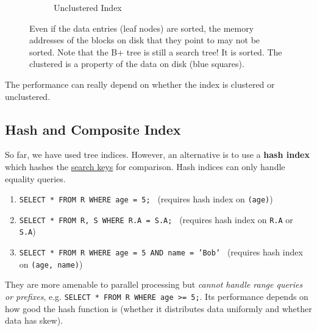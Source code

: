 \begin{definition}
\begin{figure}[H]
\begin{subfigure}[b]{0.48\textwidth}
          \caption{Unclustered Index}
        \end{subfigure}
        \caption{Even if the data entries (leaf nodes) are sorted, the memory addresses of the blocks on disk that they point to may not be sorted. Note that the B+ tree is still a search tree! It is sorted. The clustered is a property of the data on disk (blue squares).} 
        \label{fig:clustered_vs_unclustered}
      \end{figure}
    \end{definition}

    The performance can really depend on whether the index is clustered or unclustered. 

\subsection{Hash and Composite Index}

  \begin{definition}
    \label{def:hash-index}
    So far, we have used tree indices. However, an alternative is to use a \textbf{hash index} which hashes the \hyperref[def:search-key]{search keys} for comparison. Hash indices can only handle equality queries. 
    \begin{enumerate}
      \item \texttt{SELECT * FROM R WHERE age = 5; } (requires hash index on \texttt{(age)})
      \item \texttt{SELECT * FROM R, S WHERE R.A = S.A; } (requires hash index on \texttt{R.A} or \texttt{S.A})
      \item \texttt{SELECT * FROM R WHERE age = 5 AND name = 'Bob' } (requires hash index on \texttt{(age, name)})
    \end{enumerate}
    They are more amenable to parallel processing but \textit{cannot handle range queries or prefixes}, e.g. \texttt{SELECT * FROM R WHERE age >= 5;}. Its performance depends on how good the hash function is (whether it distributes data uniformly and whether data has skew). 
  \end{definition}

